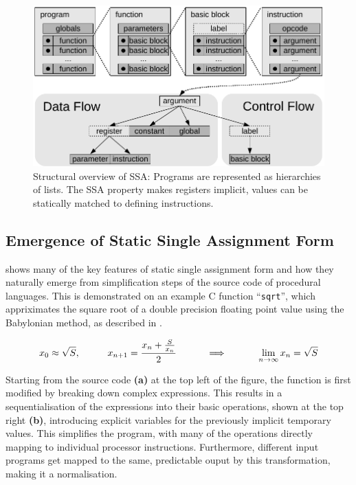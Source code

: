 \begin{figure}[h]
\centering
\includegraphics[width=\textwidth]{figures/ssaoverview}
\caption{Structural overview of SSA: Programs are represented as hierarchies of
    lists. The SSA property makes registers implicit, values can be statically
    matched to defining instructions.}
\label{fig:ssaoverview}
\end{figure}

\subsection{Emergence of Static Single Assignment Form}

     shows many of the key features of static single assignment
    form and how they naturally emerge from simplification steps of
    the source code of procedural languages.
    This is demonstrated on an example C function ``{\tt sqrt}'',
    which  appriximates the square root of a double precision floating point
    value using the Babylonian method, as described in
    .

\begin{equation}
    x_0\approx\sqrt{S},\text{\hspace{1cm}}
    x_{n+1}=\frac{x_n+\frac{S}{x_n}}{2}\text{\hspace{1cm}}
    \implies\text{\hspace{1cm}}
    \lim_{n\rightarrow\infty}x_n=\sqrt{S}
    \label{babylonian_equation}
\end{equation}

    Starting from the source code {\bf(a)} at the top left of the figure, the
    function is first modified by breaking down complex expressions.
    This results in a sequentialisation of the expressions into their
    basic operations, shown at the top right {\bf(b)}, introducing explicit
    variables for the previously implicit temporary values.
    This simplifies the program, with many of the operations directly mapping to
    individual processor instructions.
    Furthermore, different input programs get mapped to the same,
    predictable ouput by this transformation, making it a normalisation.

